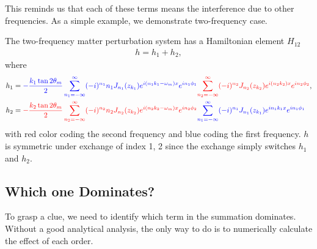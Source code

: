 \documentclass[letterpaper,12pt,english]{sphinxmanual}
\begin{document}
This reminds us that each of these terms means the interference due to other frequencies. As a simple example, we demonstrate two-frequency case.

The two-frequency matter perturbation system has a Hamiltonian element \(H_{12}\)
\begin{equation*}
\begin{split}h = h_1 + h_2,\end{split}
\end{equation*}
where
\begin{equation*}
\begin{split}h_1 & = {\color{blue}-\frac{k_1 \tan 2\theta_m}{2} \sum_{n_1=-\infty}^{\infty} (-i)^{n_1} n_1 J_{n_1} (z_{k_1}) e^{i (n_1 k_1-\omega_m)x} e^{i n_1\phi_1} } {\color{red} \sum_{n_2=-\infty}^{\infty} (-i)^{n_2} J_{n_2}(z_{k_2}) e^{i(n_2k_2)x} e^{i n_2 \phi_2}  }, \\
h_2 & = {\color{red} - \frac{k_2\tan 2\theta_m}{2} \sum_{n_2=-\infty}^{\infty} (-i)^{n_2} n_2 J_{n_2}(z_{k_2}) e^{i(n_2k_2-\omega_m)x} e^{i n_2 \phi_2}  }{\color{blue} \sum_{n_1=-\infty}^{\infty} (-i)^{n_1} J_{n_1}(z_{k_1}) e^{in_1 k_1 x} e^{i n_1 \phi_1} }\end{split}
\end{equation*}
with red color coding the second frequency and blue coding the first frequency. \(h\) is symmetric under exchange of index 1, 2 since the exchange simply switches \(h_1\) and \(h_2\).


\subsection{Which one Dominates?}
\label{\detokenize{matter-stimulated/two-frequency:which-one-dominates}}
To grasp a clue, we need to identify which term in the summation dominates. Without a good analytical analysis, the only way to do is to numerically calculate the effect of each order.
\end{document}
